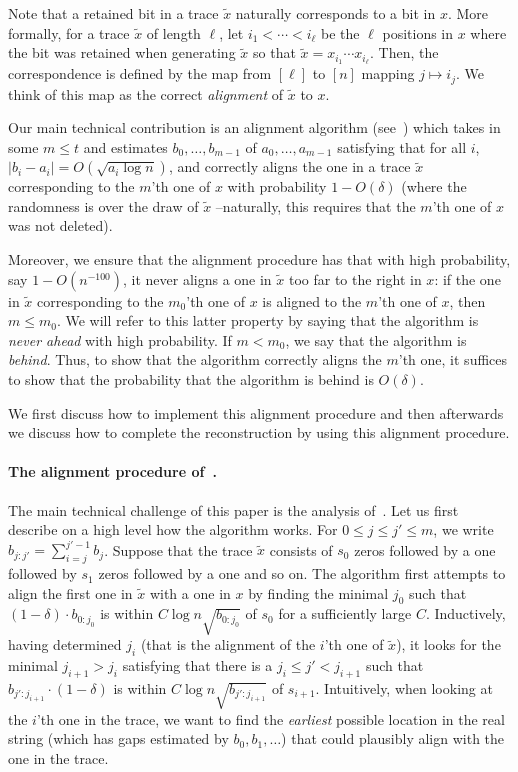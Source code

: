 \documentclass[12pt]{article}
\theoremstyle{definition}
\theoremstyle{remark}
\begin{document}
Note that a retained bit in a trace $\tilde x$ naturally corresponds to a bit in $x$. More formally, for a trace $\tilde x$ of length $\ell$, let $i_1<\cdots<i_\ell$ be the $\ell$ positions in $x$ where the bit was retained when generating $\tilde x$ so that $\tilde x=x_{i_1}\cdots x_{i_\ell}$. Then, the correspondence is defined by the map from $[\ell]$ to $[n]$ mapping $j\mapsto i_j$. We think of this map as the correct \emph{alignment} of $\tilde x$ to $x$.


Our main technical contribution is an alignment algorithm (see~) which takes in some $m \leq t$ and estimates $b_0,\dots,b_{m-1}$ of $a_0,\dots,a_{m-1}$ satisfying that for all $i$, $|b_i-a_i|=O(\sqrt{a_i\log n})$, and correctly aligns the one in a trace $\tilde x$ corresponding to the $m$'th one of $x$ with probability $1-O(\delta)$ (where the randomness is over the draw of $\tilde x$ \---naturally, this requires that the $m$'th one of $x$ was not deleted). 

Moreover, we ensure that the alignment procedure has that with high probability, say $1-O(n^{-100})$, it never aligns a one in $\tilde x$ too far to the right in $x$: if the one in $\tilde x$ corresponding to the  $m_0$'th one of $x$ is aligned to the $m$'th one of $x$, then $m\leq m_0$. We will refer to this latter property by saying that the algorithm is \emph{never ahead} with high probability. If $m< m_0$, we say that the algorithm is \emph{behind}. Thus, to show that the algorithm correctly aligns the $m$'th one, it suffices to show that the probability that the algorithm is behind is $O(\delta)$. 


We first discuss how to implement this alignment procedure and then afterwards we discuss how to complete the reconstruction by using this alignment procedure.

\paragraph{The alignment procedure of~.}
The main technical challenge of this paper is the analysis of~. Let us first describe on a high level how the algorithm works.
For $0\leq j\leq j'\leq m$, we write $b_{j:j'}=\sum_{i=j}^{j'-1}b_j$. Suppose that the trace $\tilde x$ consists of $s_0$ zeros followed by a one followed by $s_1$ zeros followed by a one and so on. The algorithm first attempts to align the first one in $\tilde x$ with a one in $x$ by finding the minimal $j_0$ such that $(1-\delta)\cdot b_{0:j_0}$ is within $C\log n\sqrt{b_{0:j_0}}$ of $s_0$ for a sufficiently large $C$. Inductively, having determined $j_i$ (that is the alignment of the $i$'th one of $\tilde x$), it looks for the minimal $j_{i+1}> j_i$ satisfying that there is a $j_i \leq j'< j_{i+1}$ such that $b_{j':j_{i+1}}\cdot(1-\delta)$ is within $C\log n\sqrt{b_{j':j_{i+1}}}$ of $s_{i+1}$.
Intuitively, when looking at the $i$'th one in the trace, we want to find the \emph{earliest} possible location in the real string (which has gaps estimated by $b_0, b_1, \dots$) that could plausibly align with the one in the trace.
\end{document}
